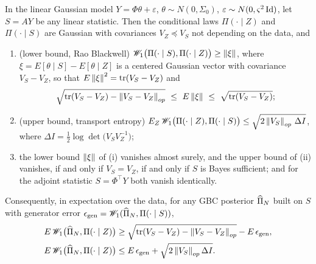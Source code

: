 \begin{theorem}\label{m:thm:gap}
In the linear Gaussian model $Y=\Phi\theta+\varepsilon$, $\theta\sim N(0,\Sigma_0)$, $\varepsilon\sim N(0,\varsigma^2\operatorname{Id})$, let $S=AY$ be any linear statistic. Then the conditional laws $\Pi(\cdot\mid Z)$ and $\Pi(\cdot\mid S)$ are Gaussian with covariances $V_Z\preceq V_S$ not depending on the data, and
\begin{enumerate}[label=(\roman*),nosep]
\item (lower bound, Rao Blackwell) $\mathscr{W}_1\big(\Pi(\cdot\mid S),\Pi(\cdot\mid Z)\big)\ge\left\|\xi\right\|$, where $\xi=E[\theta\mid S]-E[\theta\mid Z]$ is a centered Gaussian vector with covariance $V_S-V_Z$, so that $E\left\|\xi\right\|^2=\mathrm{tr}(V_S-V_Z)$ and
\[
\sqrt{\tr(V_S-V_Z)-\norm{V_S-V_Z}_{op}}\ \le\ E\norm\xi\ \le\ \sqrt{\tr(V_S-V_Z)} ;
\]
\item (upper bound, transport entropy) $E_Z\,\mathscr{W}_1\big(\Pi(\cdot\mid Z),\Pi(\cdot\mid S)\big)\le\sqrt{2\left\|V_S\right\|_{op}\,\Delta I}$, where $\Delta I=\tfrac12\log\det\big(V_SV_Z^{-1}\big)$;
\item the lower bound $\left\|\xi\right\|$ of (i) vanishes almost surely, and the upper bound of (ii) vanishes, if and only if $V_S=V_Z$, if and only if $S$ is Bayes sufficient; and for the adjoint statistic $S=\Phi^\top Y$ both vanish identically.
\end{enumerate}
Consequently, in expectation over the data, for any GBC posterior $\widehat\Pi_N$ built on $S$ with generator error $\epsilon_{\rm gen}=\mathscr{W}_1(\widehat\Pi_N,\Pi(\cdot\mid S))$,
\[
\begin{aligned}
E\,\mathscr{W}_1\big(\widehat\Pi_N,\Pi(\cdot\mid Z)\big)&\ge\sqrt{\mathrm{tr}(V_S-V_Z)-\left\|V_S-V_Z\right\|_{op}}-E\,\epsilon_{\rm gen},\\
E\,\mathscr{W}_1\big(\widehat\Pi_N,\Pi(\cdot\mid Z)\big)&\le E\,\epsilon_{\rm gen}+\sqrt{2\left\|V_S\right\|_{op}\Delta I}.
\end{aligned}
\]
\end{theorem}

